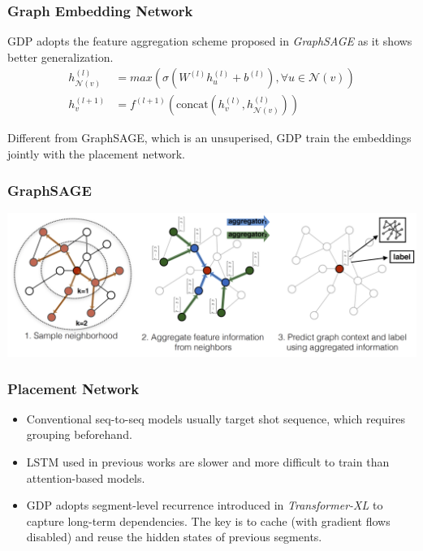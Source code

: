 \documentclass[12pt,aspectratio=169]{beamer}
\begin{document}
    \begin{frame}
        \frametitle{Graph Embedding Network}

        GDP adopts the feature aggregation scheme proposed in \textit{GraphSAGE} as it shows better generalization.
        \begin{align*}
            h^{(l)}_{\mathcal{N}(v)} &= max(\sigma(W^{(l)}h^{(l)}_u + b^{(l)}), \forall u \in \mathcal{N}(v)) \\
            h^{(l+1)}_v &= f^{(l+1)}(\text{concat}(h^{(l)}_v, h^{(l)}_{\mathcal{N}(v)}))
        \end{align*}

        Different from GraphSAGE, which is an unsuperised, GDP train the embeddings jointly with the placement network.
    \end{frame}

    \begin{frame}
        \frametitle{GraphSAGE}

        \centering
        \includegraphics[width=\textwidth]{graphsage.png}
    \end{frame}

    \begin{frame}
        \frametitle{Placement Network}

        \begin{itemize}
            \setlength{\itemsep}{.8em}
            \item Conventional seq-to-seq models usually target shot sequence, which requires grouping beforehand.
            \item LSTM used in previous works are slower and more difficult to train than attention-based models.
            \item GDP adopts segment-level recurrence introduced in \textit{Transformer-XL} to capture long-term
                  dependencies. The key is to cache (with gradient flows disabled) and reuse the hidden states of
                  previous segments.
        \end{itemize}
    \end{frame}
\end{document}
